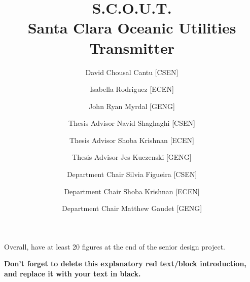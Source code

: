 \documentclass{scu-thesis}
\author{David Chousal Cantu [CSEN]}
\author{Isabella Rodriguez [ECEN]}
\author{John Ryan Myrdal [GENG]}
\title{S.C.O.U.T.\texorpdfstring{\\}{ -- }Santa Clara Oceanic Utilities Transmitter}
\begin{document}
\frontmatter
\noindent
\begin{minipage}[t]{0.49\textwidth}
\signature{Thesis Advisor Navid Shaghaghi [CSEN]}
\signature{Thesis Advisor Shoba Krishnan [ECEN]}
\signature{Thesis Advisor Jes Kuczenski [GENG]}
\end{minipage}\hfill
\begin{minipage}[t]{0.49\textwidth}
\signature{Department Chair Silvia Figueira [CSEN]}
\signature{Department Chair Shoba Krishnan [ECEN]}
\signature{Department Chair Matthew Gaudet [GENG]}
\end{minipage}

\maketitle


\tableofcontents %

\listoffigures %

\begin{tcolorbox}[      %
    boxrule=0pt,        %
    colback=white,      %
    coltext=red         %
]                       %
    Overall, have at least 20 figures at the end of the senior design project. 
    
    \vspace{15pt}       %
    \begin{center}      %
    \textbf{Don't forget to delete this explanatory red text/block introduction, and replace it with your text in black.}
    \end{center}        %
\end{tcolorbox}         %

\mainmatter













\backmatter
\end{document}
